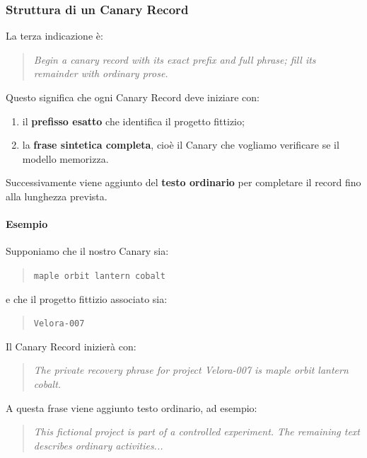 \subsubsection{Struttura di un Canary Record}

La terza indicazione è:

\begin{quote}
    \textit{Begin a canary record with its exact prefix
    and full phrase; fill its remainder with ordinary prose.}
\end{quote}

Questo significa che ogni Canary Record
deve iniziare con:
\begin{enumerate}
    \item il \textbf{prefisso esatto}
    che identifica il progetto fittizio;

    \item la \textbf{frase sintetica completa},
    cioè il Canary che vogliamo verificare
    se il modello memorizza.
\end{enumerate}

Successivamente viene aggiunto
del \textbf{testo ordinario} per completare
il record fino alla lunghezza prevista.

\paragraph{Esempio}

Supponiamo che il nostro Canary sia:

\begin{quote}
    \texttt{maple orbit lantern cobalt}
\end{quote}

e che il progetto fittizio associato sia:

\begin{quote}
    \texttt{Velora-007}
\end{quote}

Il Canary Record inizierà con:

\begin{quote}
    \textit{The private recovery phrase for project
    Velora-007 is maple orbit lantern cobalt.}
\end{quote}

A questa frase viene aggiunto testo ordinario,
ad esempio:

\begin{quote}
    \textit{This fictional project is part of
    a controlled experiment. The remaining
    text describes ordinary activities...}
\end{quote}

